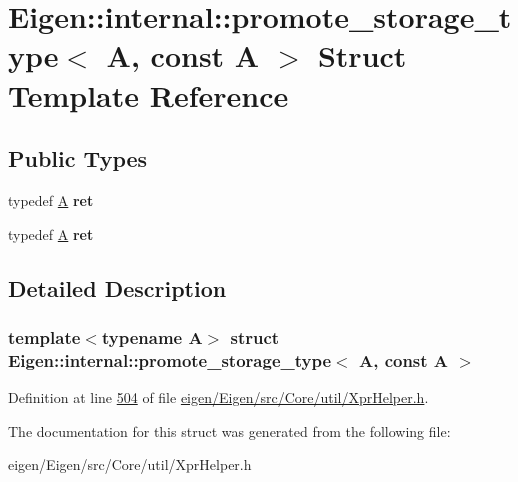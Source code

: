 \hypertarget{struct_eigen_1_1internal_1_1promote__storage__type_3_01_a_00_01const_01_a_01_4}{}\section{Eigen\+:\+:internal\+:\+:promote\+\_\+storage\+\_\+type$<$ A, const A $>$ Struct Template Reference}
\label{struct_eigen_1_1internal_1_1promote__storage__type_3_01_a_00_01const_01_a_01_4}
\subsection*{Public Types}
\begin{DoxyCompactItemize}
\item 
\mbox{\label{struct_eigen_1_1internal_1_1promote__storage__type_3_01_a_00_01const_01_a_01_4_a467ead79b4ebc007504bc2560a556094}} 
typedef \hyperlink{group___core___module_class_eigen_1_1_matrix}{A} {\bfseries ret}
\item 
\mbox{\label{struct_eigen_1_1internal_1_1promote__storage__type_3_01_a_00_01const_01_a_01_4_a467ead79b4ebc007504bc2560a556094}} 
typedef \hyperlink{group___core___module_class_eigen_1_1_matrix}{A} {\bfseries ret}
\end{DoxyCompactItemize}


\subsection{Detailed Description}
\subsubsection*{template$<$typename A$>$\newline
struct Eigen\+::internal\+::promote\+\_\+storage\+\_\+type$<$ A, const A $>$}



Definition at line \hyperlink{eigen_2_eigen_2src_2_core_2util_2_xpr_helper_8h_source_l00504}{504} of file \hyperlink{eigen_2_eigen_2src_2_core_2util_2_xpr_helper_8h_source}{eigen/\+Eigen/src/\+Core/util/\+Xpr\+Helper.\+h}.



The documentation for this struct was generated from the following file\+:\begin{DoxyCompactItemize}
\item 
eigen/\+Eigen/src/\+Core/util/\+Xpr\+Helper.\+h\end{DoxyCompactItemize}
